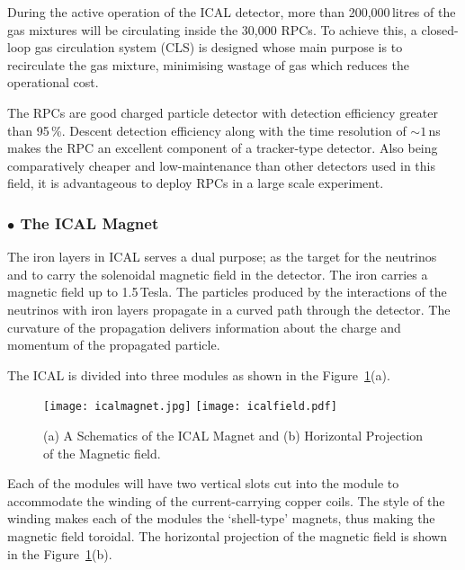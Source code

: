 During the active operation of the ICAL detector, more than
200,000\,litres of the gas mixtures will be circulating inside the
30,000 RPCs. To achieve this, a closed-loop gas circulation system
(CLS) is designed whose main purpose is to recirculate the gas
mixture, minimising wastage of gas which reduces the operational cost.

The RPCs are good charged particle detector with detection efficiency
greater than 95\,\%. Descent detection efficiency along with the time
resolution of $\sim 1$\,ns makes the RPC an excellent component of a
tracker-type detector. Also being comparatively cheaper and
low-maintenance than other detectors used in this field, it is
advantageous to deploy RPCs in a large scale experiment.

\subsubsection*{$\bullet$ The ICAL Magnet}
The iron layers in ICAL serves a dual purpose; as the target for the
neutrinos and to carry the solenoidal magnetic field in the
detector\cite{icalmagnet}. The iron carries a magnetic field up to
1.5\,Tesla. The particles produced by the interactions of the
neutrinos with iron layers propagate in a curved path through the
detector. The curvature of the propagation delivers information about
the charge and momentum of the propagated particle.

The ICAL is divided into three modules as shown in the
Figure~\ref{fig:magnet}(a). 
\begin{figure}[h]
  \centering
  \texttt{[image: icalmagnet.jpg]}
  \texttt{[image: icalfield.pdf]}
  \caption{(a) A Schematics of the ICAL Magnet and (b) Horizontal Projection of the Magnetic field\cite{icalmagnet}.}
  \label{fig:magnet}
\end{figure}
Each of the modules will have two vertical slots cut into the module
to accommodate the winding of the current-carrying copper coils. The
style of the winding makes each of the modules the
`shell-type'\cite{transformer} magnets, thus making the magnetic field
toroidal. The horizontal projection of the magnetic field is shown in
the Figure~\ref{fig:magnet}(b).

